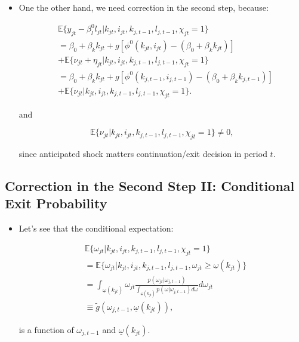 \documentclass[]{book}
\providecommand{\tightlist}{%
  \setlength{\itemsep}{0pt}\setlength{\parskip}{0pt}}
\theoremstyle{definition}
\theoremstyle{definition}
\theoremstyle{definition}
\theoremstyle{remark}
\begin{document}
\begin{itemize}
\tightlist
\item
  One the other hand, we need correction in the second step, because:

  \begin{equation}
  \begin{split}
  &\mathbb{E}\{y_{jt} - \beta_l^0 l_{jt}|k_{jt}, i_{jt}, k_{j, t - 1}, l_{j, t - 1}, \chi_{jt} = 1\} \\
  &= \beta_0 + \beta_k k_{jt} + g[\phi^0(k_{jt}, i_{jt}) - (\beta_0 + \beta_k k_{jt})]\\
  & + \mathbb{E}\{\nu_{jt} + \eta_{jt}| k_{jt}, i_{jt}, k_{j, t - 1}, l_{j, t - 1}, \chi_{jt} = 1\}\\
  &= \beta_0 + \beta_k k_{jt} + g[\phi^0(k_{j, t - 1}, i_{j, t - 1}) - (\beta_0 + \beta_k k_{j, t - 1})]\\
  & + \mathbb{E}\{\nu_{jt}| k_{jt}, i_{jt}, k_{j, t - 1}, l_{j, t - 1} , \chi_{jt} = 1\}.
  \end{split}
  \end{equation}

  and

  \begin{equation}
  \mathbb{E}\{\nu_{jt}| k_{jt}, i_{jt}, k_{j, t - 1}, l_{j, t - 1}, \chi_{jt} = 1 \} \neq 0,
  \end{equation}

  since anticipated shock matters continuation/exit decision in period
  \(t\).
\end{itemize}

\subsection{Correction in the Second Step II: Conditional Exit
Probability}\label{correction-in-the-second-step-ii-conditional-exit-probability}

\begin{itemize}
\tightlist
\item
  Let's see that the conditional expectation:

  \begin{equation}
  \begin{split}
  &\mathbb{E}\{\omega_{jt}| k_{jt}, i_{jt}, k_{j, t - 1}, l_{j, t - 1}, \chi_{jt} = 1 \}\\
  &=\mathbb{E}\{\omega_{jt}| k_{jt}, i_{jt}, k_{j, t - 1}, l_{j, t - 1}, \omega_{jt} \ge \underline{\omega}(k_{jt}) \}\\
  &=\int_{\underline{\omega}(k_{jt})} \omega_{jt} \frac{p(\omega_{jt}|\omega_{j, t - 1})}{\int_{\underline{\omega}(k_{jt})} p(\omega|\omega_{j, t - 1}) d\omega } d \omega_{jt}\\
  &\equiv \tilde{g}(\omega_{j, t - 1}, \underline{\omega}(k_{jt})),
  \end{split}
  \end{equation}

  is a function of \(\omega_{j, t - 1}\) and
  \(\underline{\omega}(k_{jt})\).
\end{itemize}
\end{document}

